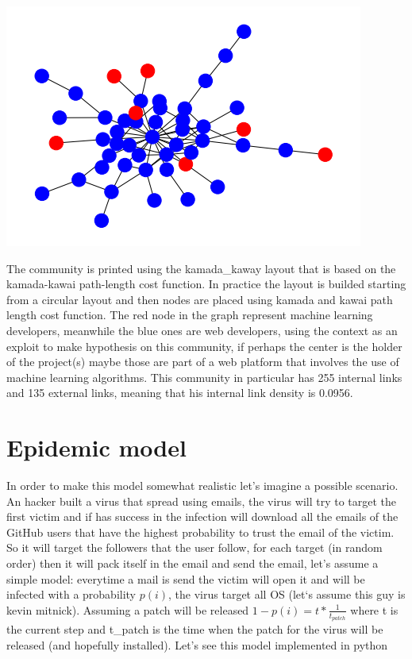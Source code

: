 \documentclass[]{article}
\begin{document}
    \begin{center}
        \includegraphics[]{charts/community14_graph.png}
    \end{center}
    The community is printed using the kamada\_kaway layout that is based on the kamada-kawai path-length cost function. In practice the layout is builded starting from a circular layout and then nodes are placed using kamada and kawai path length cost function. The red node in the graph represent machine learning developers, meanwhile the blue ones are web developers, using the context as an exploit to make hypothesis on this community, if perhaps the center is the holder of the project(s) maybe those are part of a web platform that involves the use of machine learning algorithms. This community in particular has 255 internal links and 135 external links, meaning that his internal link density is 0.0956. 
    
    \section*{Epidemic model}
    In order to make this model somewhat realistic let's imagine a possible scenario.
    An hacker built a virus that spread using emails, the virus will try to target the first victim and if has success in the infection will download all the emails of the GitHub users that have the highest probability to trust the email of the victim. So it will target the followers that the user follow, for each target (in random order) then it will pack itself in the email and send the email, let's assume a simple model: everytime a mail is send the victim will open it and will be infected with a probability $p(i)$, the virus target all OS (let`s assume this guy is kevin mitnick). Assuming a patch will be released $1 - p(i) = t * \frac{1}{t_{patch}}$ where t is the current step and t\_patch is the time when the patch for the virus will be released (and hopefully installed). Let's see this model implemented in python 
\end{document}
